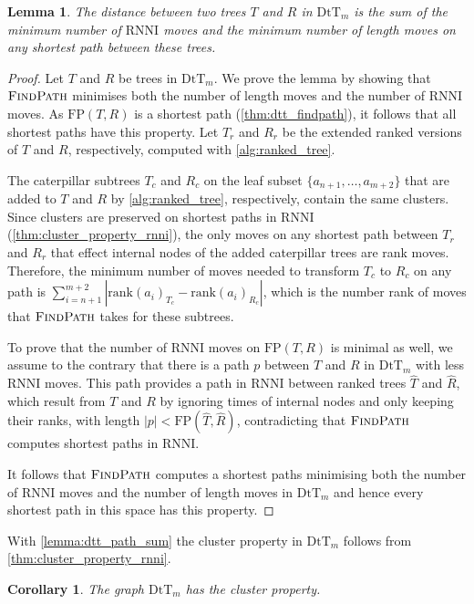 \documentclass[11pt]{amsart}
\newtheorem{lemma}{Lemma}
\newtheorem{corollary}{Corollary}
\newcommand{\rnni}{\mathrm{RNNI}}
\newcommand{\findpath}{\textsc{FindPath}}
\newcommand{\rank}{\mathrm{rank}}
\newcommand{\fp}{\mathrm{FP}}
\newcommand{\dtt}{\mathrm{DtT}}
\begin{document}
\begin{lemma}
	The distance between two trees $T$ and $R$ in $\dtt_m$ is the sum of the minimum number of $\rnni$ moves and the minimum number of length moves on any shortest path between these trees.
	\label{lemma:dtt_path_sum}
\end{lemma}

\begin{proof}
	Let $T$ and $R$ be trees in $\dtt_m$.
	We prove the lemma by showing that $\findpath$ minimises both the number of length moves and the number of $\rnni$ moves.
	As $\fp(T,R)$ is a shortest path (\autoref{thm:dtt_findpath}), it follows that all shortest paths have this property.
	Let $T_r$ and $R_r$ be the extended ranked versions of $T$ and $R$, respectively, computed with \autoref{alg:ranked_tree}.

	The caterpillar subtrees $T_c$ and $R_c$ on the leaf subset $\{a_{n+1}, \ldots, a_{m+2}\}$ that are added to $T$ and $R$ by \autoref{alg:ranked_tree}, respectively, contain the same clusters.
	Since clusters are preserved on shortest paths in $\rnni$ (\autoref{thm:cluster_property_rnni}), the only moves on any shortest path between $T_r$ and $R_r$ that effect internal nodes of the added caterpillar trees are rank moves.
	Therefore, the minimum number of moves needed to transform $T_c$ to $R_c$ on any path is $\sum_{i = n+1}^{m+2} |\rank(a_{i})_{T_c} - \rank(a_{i})_{R_c}|$, which is the number rank of moves that $\findpath$ takes for these subtrees.

	To prove that the number of $\rnni$ moves on $\fp(T,R)$ is minimal as well, we assume to the contrary that there is a path $p$ between $T$ and $R$ in $\dtt_m$ with less $\rnni$ moves.
	This path provides a path in $\rnni$ between ranked trees $\hat T$ and $\hat R$, which result from $T$ and $R$ by ignoring times of internal nodes and only keeping their ranks, with length $|p| < \fp(\hat T, \hat R)$, contradicting that $\findpath$ computes shortest paths in $\rnni$.

	It follows that $\findpath$ computes a shortest paths minimising both the number of $\rnni$ moves and the number of length moves in $\dtt_m$ and hence every shortest path in this space has this property.
\end{proof}

With \autoref{lemma:dtt_path_sum} the cluster property in $\dtt_m$ follows from \autoref{thm:cluster_property_rnni}.

\begin{corollary}
	The graph $\dtt_m$ has the cluster property.
\end{corollary}
\end{document}
